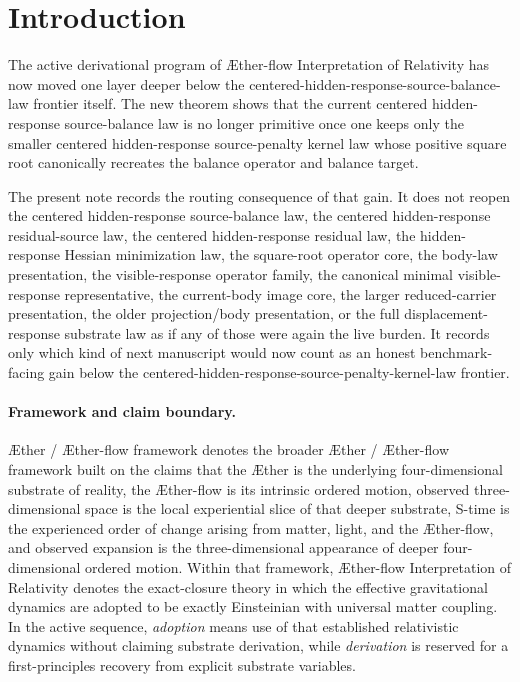 \documentclass[11pt]{article}
\newcommand{\Aether}{\AE{}ther}
\newcommand{\Aflow}{\AE{}ther-flow}
\newcommand{\TheoryName}{\Aflow{} Interpretation of Relativity}
\newcommand{\TheoryProgram}{\Aether{} / \Aflow{} framework}
\begin{document}
\section{Introduction}

The active derivational program of \TheoryName{} has now moved one layer deeper below the centered-hidden-response-source-balance-law frontier itself. The new theorem shows that the current centered hidden-response source-balance law is no longer primitive once one keeps only the smaller centered hidden-response source-penalty kernel law whose positive square root canonically recreates the balance operator and balance target.

The present note records the routing consequence of that gain. It does not reopen the centered hidden-response source-balance law, the centered hidden-response residual-source law, the centered hidden-response residual law, the hidden-response Hessian minimization law, the square-root operator core, the body-law presentation, the visible-response operator family, the canonical minimal visible-response representative, the current-body image core, the larger reduced-carrier presentation, the older projection/body presentation, or the full displacement-response substrate law as if any of those were again the live burden. It records only which kind of next manuscript would now count as an honest benchmark-facing gain below the centered-hidden-response-source-penalty-kernel-law frontier.

\paragraph{Framework and claim boundary.}
\TheoryProgram{} denotes the broader \Aether{} / \Aflow{} framework built on the claims that the \Aether{} is the underlying four-dimensional substrate of reality, the \Aflow{} is its intrinsic ordered motion, observed three-dimensional space is the local experiential slice of that deeper substrate, S-time is the experienced order of change arising from matter, light, and the \Aflow{}, and observed expansion is the three-dimensional appearance of deeper four-dimensional ordered motion. Within that framework, \TheoryName{} denotes the exact-closure theory in which the effective gravitational dynamics are adopted to be exactly Einsteinian with universal matter coupling. In the active sequence, \emph{adoption} means use of that established relativistic dynamics without claiming substrate derivation, while \emph{derivation} is reserved for a first-principles recovery from explicit substrate variables.
\end{document}
